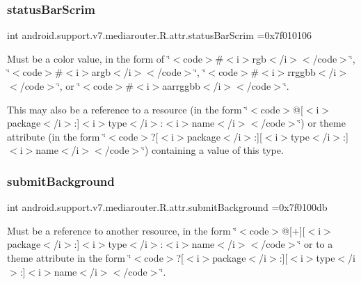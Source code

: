 \subsubsection{\texorpdfstring{status\+Bar\+Scrim}{statusBarScrim}}
{\footnotesize\ttfamily int android.\+support.\+v7.\+mediarouter.\+R.\+attr.\+status\+Bar\+Scrim =0x7f010106\hspace{0.3cm}{\ttfamily [static]}}

Must be a color value, in the form of \char`\"{}$<$code$>$\#$<$i$>$rgb$<$/i$>$$<$/code$>$\char`\"{}, \char`\"{}$<$code$>$\#$<$i$>$argb$<$/i$>$$<$/code$>$\char`\"{}, \char`\"{}$<$code$>$\#$<$i$>$rrggbb$<$/i$>$$<$/code$>$\char`\"{}, or \char`\"{}$<$code$>$\#$<$i$>$aarrggbb$<$/i$>$$<$/code$>$\char`\"{}. 

This may also be a reference to a resource (in the form \char`\"{}$<$code$>$@\mbox{[}$<$i$>$package$<$/i$>$\+:\mbox{]}$<$i$>$type$<$/i$>$\+:$<$i$>$name$<$/i$>$$<$/code$>$\char`\"{}) or theme attribute (in the form \char`\"{}$<$code$>$?\mbox{[}$<$i$>$package$<$/i$>$\+:\mbox{]}\mbox{[}$<$i$>$type$<$/i$>$\+:\mbox{]}$<$i$>$name$<$/i$>$$<$/code$>$\char`\"{}) containing a value of this type. \mbox{\label{classandroid_1_1support_1_1v7_1_1mediarouter_1_1R_1_1attr_a49c44635804f56e76dc9ee2f70f461fc}} 
\subsubsection{\texorpdfstring{submit\+Background}{submitBackground}}
{\footnotesize\ttfamily int android.\+support.\+v7.\+mediarouter.\+R.\+attr.\+submit\+Background =0x7f0100db\hspace{0.3cm}{\ttfamily [static]}}

Must be a reference to another resource, in the form \char`\"{}$<$code$>$@\mbox{[}+\mbox{]}\mbox{[}$<$i$>$package$<$/i$>$\+:\mbox{]}$<$i$>$type$<$/i$>$\+:$<$i$>$name$<$/i$>$$<$/code$>$\char`\"{} or to a theme attribute in the form \char`\"{}$<$code$>$?\mbox{[}$<$i$>$package$<$/i$>$\+:\mbox{]}\mbox{[}$<$i$>$type$<$/i$>$\+:\mbox{]}$<$i$>$name$<$/i$>$$<$/code$>$\char`\"{}. \mbox{\label{classandroid_1_1support_1_1v7_1_1mediarouter_1_1R_1_1attr_a66bf2c904966e1bb3cca8099c7dc3882}} 
